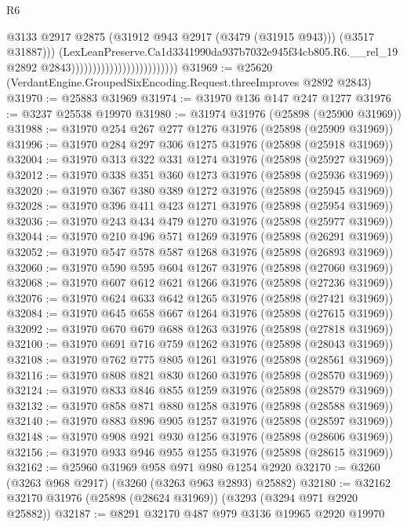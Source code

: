 \begin{lexlean}{R6}
\begin{coremodule}
                                                        @3133
                                                        @2917
                                                        @2875
                                                        (@31912 @943 @2917 (@3479 (@31915 @943)))
                                                        (@3517 @31887)))
                                                    (LexLeanPreserve.Ca1d3341990da937b7032e945f34cb805.R6.__rel_19
                                                      @2892
                                                      @2843)))))))))))))))))))))))))
@31969 := @25620 (VerdantEngine.GroupedSixEncoding.Request.threeImproves @2892 @2843)
@31970 := @25883 @31969
@31974 := @31970 @136 @147 @247 @1277
@31976 := @3237 @25538 @19970
@31980 := @31974 @31976 (@25898 (@25900 @31969))
@31988 := @31970 @254 @267 @277 @1276 @31976 (@25898 (@25909 @31969))
@31996 := @31970 @284 @297 @306 @1275 @31976 (@25898 (@25918 @31969))
@32004 := @31970 @313 @322 @331 @1274 @31976 (@25898 (@25927 @31969))
@32012 := @31970 @338 @351 @360 @1273 @31976 (@25898 (@25936 @31969))
@32020 := @31970 @367 @380 @389 @1272 @31976 (@25898 (@25945 @31969))
@32028 := @31970 @396 @411 @423 @1271 @31976 (@25898 (@25954 @31969))
@32036 := @31970 @243 @434 @479 @1270 @31976 (@25898 (@25977 @31969))
@32044 := @31970 @210 @496 @571 @1269 @31976 (@25898 (@26291 @31969))
@32052 := @31970 @547 @578 @587 @1268 @31976 (@25898 (@26893 @31969))
@32060 := @31970 @590 @595 @604 @1267 @31976 (@25898 (@27060 @31969))
@32068 := @31970 @607 @612 @621 @1266 @31976 (@25898 (@27236 @31969))
@32076 := @31970 @624 @633 @642 @1265 @31976 (@25898 (@27421 @31969))
@32084 := @31970 @645 @658 @667 @1264 @31976 (@25898 (@27615 @31969))
@32092 := @31970 @670 @679 @688 @1263 @31976 (@25898 (@27818 @31969))
@32100 := @31970 @691 @716 @759 @1262 @31976 (@25898 (@28043 @31969))
@32108 := @31970 @762 @775 @805 @1261 @31976 (@25898 (@28561 @31969))
@32116 := @31970 @808 @821 @830 @1260 @31976 (@25898 (@28570 @31969))
@32124 := @31970 @833 @846 @855 @1259 @31976 (@25898 (@28579 @31969))
@32132 := @31970 @858 @871 @880 @1258 @31976 (@25898 (@28588 @31969))
@32140 := @31970 @883 @896 @905 @1257 @31976 (@25898 (@28597 @31969))
@32148 := @31970 @908 @921 @930 @1256 @31976 (@25898 (@28606 @31969))
@32156 := @31970 @933 @946 @955 @1255 @31976 (@25898 (@28615 @31969))
@32162 := @25960 @31969 @958 @971 @980 @1254 @2920
@32170 := @3260 (@3263 @968 @2917) (@3260 (@3263 @963 @2893) @25882)
@32180 := @32162 @32170 @31976 (@25898 (@28624 @31969)) (@3293 (@3294 @971 @2920 @25882))
@32187 := @8291 @32170 @487 @979 @3136 @19965 @2920 @19970

\end{coremodule}
\end{lexlean}
